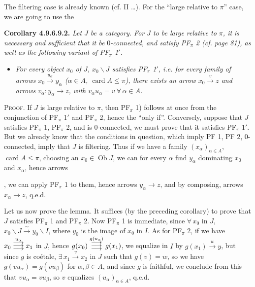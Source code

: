\documentclass[11pt]{article}
\newcommand{\printedpage}[1]{\marginpar{\footnotesize p.~#1}}
\newcommand{\msp}[1]{\marginpar{\footnotesize [#1]}}
\newcommand{\Ob}{\operatorname{Ob}}
\newcommand{\card}{\operatorname{card}}
\newcommand{\trois}[1]{\mathrel{\overset{#1}{\vcenter{\offinterlineskip\hbox{$\longrightarrow$}\vskip0.5pt\hbox{$\longrightarrow$}\vskip0.5pt\hbox{$\longrightarrow$}}}}}
\begin{document}
\printedpage{89}

The filtering case is already known (cf. II \dots). For the ``large relative to $\pi$'' case, we are going to use the

\textbf{Corollary 4.9.6.9.2.} \textit{Let $J$ be a category. For $J$ to be large relative to $\pi$, it}
\msp{page 238}
\textit{is necessary and sufficient that it be $0$-connected, and satisfy PF$_\pi$ 2 (cf. page 81), as well as the following variant of PF$_\pi$ 1$'$.}
\begin{itemize}[leftmargin=4em]
\item[\textit{PF$_\pi$ 1)}] \textit{For every object $x_0$ of $J$, $x_0\backslash J$ satisfies PF$_\pi$ 1$'$, i.e. for every family of arrows $x_0 \xrightarrow{u_\alpha} y_\alpha$ ($\alpha \in A$, $\card A \leqslant \pi$), there exists an arrow $x_0 \xrightarrow{v} z$ and arrows $v_\alpha : y_\alpha \longrightarrow z$, with $v_\alpha u_\alpha = v \ \forall\, \alpha \in A$.}
\end{itemize}

\textsc{Proof}. If $J$ is large relative to $\pi$, then PF$_\pi$ 1) follows at once from the conjunction of PF$_\pi$ 1$'$ and PF$_\pi$ 2, hence the ``only if''. Conversely, suppose that $J$ satisfies PF$_\pi$ 1, PF$_\pi$ 2, and is 0-connected, we must prove that it satisfies PF$_\pi$ 1$'$. But we already know that the conditions in question, which imply PF 1, PF 2, 0-connected, imply that $J$ is filtering. Thus if we have a family $(x_\alpha)_{\alpha\in A}$, $\card A \leqslant \pi$, choosing an $x_0 \in \Ob J$, we can for every $\alpha$ find $y_\alpha$ dominating $x_0$ and $x_\alpha$, hence arrows
, we can apply PF$_\pi$ 1 to them, hence arrows $y_\alpha \longrightarrow z$, and by composing, arrows $x_\alpha \longrightarrow z$, q.e.d. %

Let us now prove the lemma. It suffices (by the preceding corollary) to prove that $J$ satisfies PF$_\pi$ 1 and PF$_\pi$ 2. Now PF$_\pi$ 1 is immediate, since $\forall\, x_0$ in $J$, $x_0\backslash J \xrightarrow{\ \sim\ } y_0\backslash I$, where $y_0$ is
\msp{page 239}
the image of $x_0$ in $I$. As for PF$_\pi$ 2, if we have $x_0 \trois{u_\alpha} x_1$ in $J$, hence $g(x_0) \trois{g(u_\alpha)} g(x_1)$, we equalize in $I$ by $g(x_1) \xrightarrow{w} y$, but since $g$ is coétale, $\exists\, x_1 \xrightarrow{v} x_2$ in $J$ such that $g(v) = w$, so we have $g(vu_\alpha) = g(vu_\beta)$ for $\alpha, \beta \in A$, and since $g$ is faithful, we conclude from this that $vu_\alpha = vu_\beta$, so $v$ equalizes $(u_\alpha)_{\alpha\in A}$, q.e.d.
\end{document}
